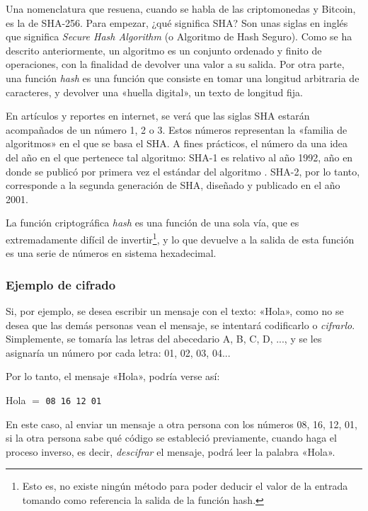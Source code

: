 \documentclass[12pt,a4paper,twoside]{book}
\begin{document}
Una nomenclatura que resuena, cuando se habla de las criptomonedas y Bitcoin, es la de SHA-256. Para empezar, ¿qué significa SHA? Son unas siglas en inglés que significa \textit{Secure Hash Algorithm} (o Algoritmo de Hash Seguro). Como se ha descrito anteriormente, un algoritmo es un conjunto ordenado y finito de operaciones, con la finalidad de devolver una valor a su salida. Por otra parte, una función \textit{hash} es una función que consiste en tomar una longitud arbitraria de caracteres, y devolver una «huella digital», un texto de longitud fija. 

En artículos y reportes en internet, se verá que las siglas SHA estarán acompañados de un número 1, 2 o 3. Estos números representan la «familia de algoritmos» en el que se basa el SHA. A fines prácticos, el número da una idea del año en el que pertenece tal algoritmo: SHA-1 es relativo al año 1992, año en donde se publicó por primera vez el estándar del algoritmo \cite{fr:sha}. SHA-2, por lo tanto, corresponde a la segunda generación de SHA, diseñado y publicado en el año 2001.

La función criptográfica \textit{hash} es una función de una sola vía, que es extremadamente difícil de invertir\footnote{Esto es, no existe ningún método para poder deducir el valor de la entrada tomando como referencia la salida de la función hash.}, y lo que devuelve a la salida de esta función es una serie de números en sistema hexadecimal.

\subsubsection{Ejemplo de cifrado}
Si, por ejemplo, se desea escribir un mensaje con el texto: «Hola», como no se desea que las demás personas vean el mensaje, se intentará codificarlo o \textit{cifrarlo}. Simplemente, se tomaría las letras del abecedario A, B, C, D, ..., y se les asignaría un número por cada letra: 01, 02, 03, 04...

Por lo tanto, el mensaje «Hola», podría verse así:

\begin{center}
Hola $ = $ \texttt{08 16 12 01}
\end{center}

En este caso, al enviar un mensaje a otra persona con los números 08, 16, 12, 01, si la otra persona sabe qué código se estableció previamente, cuando haga el proceso inverso, es decir, \textit{descifrar} el mensaje, podrá leer la palabra «Hola».
\end{document}
